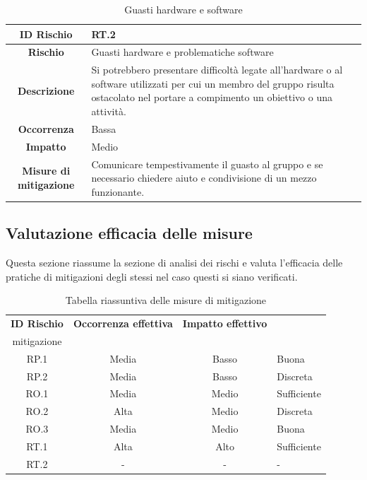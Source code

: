 \documentclass[10pt, a4paper]{article}
\begin{document}
{{{{{\renewcommand{\arraystretch}{1.5}
\begin{table}[H]
\begin{tabularx}{\textwidth}{c|X}
\textbf{ID Rischio} & RT.2 \\
\hline
\textbf{Rischio} & Guasti hardware e problematiche software \\
\hline
\textbf{Descrizione} & Si potrebbero presentare difficoltà legate all’hardware o al software utilizzati per cui un membro del gruppo risulta ostacolato nel portare a compimento un obiettivo o una attività. \\
\hline
\textbf{Occorrenza} & Bassa \\
\hline
\textbf{Impatto} & Medio\\
\hline
\textbf{Misure di mitigazione} & Comunicare tempestivamente il guasto al gruppo e se necessario chiedere aiuto e condivisione di un mezzo funzionante.\\
\end{tabularx}
\caption{Guasti hardware e software}
\end{table}


\subsection{Valutazione efficacia delle misure}
Questa sezione riassume la sezione di analisi dei rischi e valuta l'efficacia delle pratiche di mitigazioni degli stessi nel caso questi si siano verificati.\\
{\renewcommand{\arraystretch}{1.5}
\begin{table}[H]
\begin{tabularx}{\textwidth}{c|c|c|X}
\textbf{ID Rischio} & \textbf{Occorrenza effettiva} & \textbf{Impatto effettivo} & \textbf{\quantities{Efficacia misure di \\mitigazione}} \\
\hline
RP.1 & Media & Basso & Buona\\
\hline
RP.2 & Media & Basso & Discreta \\
\hline
RO.1 & Media & Medio & Sufficiente\\
\hline
RO.2 & Alta & Medio & Discreta\\
\hline
RO.3 & Media & Medio & Buona\\
\hline
RT.1 & Alta & Alto & Sufficiente\\
\hline
RT.2 & - & - & -\\


\end{tabularx}
\caption{Tabella riassuntiva delle misure di mitigazione}
\end{table}

}}}}}}
\end{document}
